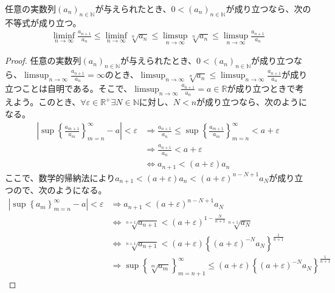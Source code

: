 \documentclass[dvipdfmx]{jsarticle}
\begin{document}
\begin{thm}\label{4.1.6.8}
任意の実数列$\left( a_{n} \right)_{n \in \mathbb{N}}$が与えられたとき、$0 < \left( a_{n} \right)_{n \in \mathbb{N}}$が成り立つなら、次の不等式が成り立つ。
\begin{align*}
\liminf_{n \rightarrow \infty}\frac{a_{n + 1}}{a_{n}} \leq \liminf_{n \rightarrow \infty}\sqrt[n]{a_{n}} \leq \limsup_{n \rightarrow \infty}\sqrt[n]{a_{n}} \leq \limsup_{n \rightarrow \infty}\frac{a_{n + 1}}{a_{n}}
\end{align*}
\end{thm}
\begin{proof}
任意の実数列$\left( a_{n} \right)_{n \in \mathbb{N}}$が与えられたとき、$0 < \left( a_{n} \right)_{n \in \mathbb{N}}$が成り立つなら、$\limsup_{n \rightarrow \infty}\frac{a_{n + 1}}{a_{n}} = \infty$のとき、$\limsup_{n \rightarrow \infty}\sqrt[n]{a_{n}} \leq \limsup_{n \rightarrow \infty}\frac{a_{n + 1}}{a_{n}}$が成り立つことは自明である。そこで、$\limsup_{n \rightarrow \infty}\frac{a_{n + 1}}{a_{n}} = a \in \mathbb{R}$が成り立つときで考えよう。このとき、$\forall\varepsilon \in \mathbb{R}^{+}\exists N \in \mathbb{N}$に対し、$N < n$が成り立つなら、次のようになる。
\begin{align*}
\left| \sup\left\{ \frac{a_{m + 1}}{a_{m}} \right\}_{m = n}^{\infty} - a \right| < \varepsilon &\Rightarrow \frac{a_{n + 1}}{a_{n}} \leq \sup\left\{ \frac{a_{m + 1}}{a_{m}} \right\}_{m = n}^{\infty} < a + \varepsilon\\
&\Rightarrow \frac{a_{n + 1}}{a_{n}} < a + \varepsilon\\
&\Leftrightarrow a_{n + 1} < (a + \varepsilon)a_{n}
\end{align*}
ここで、数学的帰納法により$a_{n + 1} < (a + \varepsilon)a_{n} < (a + \varepsilon)^{n - N + 1}a_{N}$が成り立つので、次のようになる。
\begin{align*}
\left| \sup\left\{ a_{m} \right\}_{m = n}^{\infty} - a \right| < \varepsilon &\Rightarrow a_{n + 1} < (a + \varepsilon)^{n - N + 1}a_{N}\\
&\Leftrightarrow \sqrt[{n + 1}]{a_{n + 1}} < (a + \varepsilon)^{1 - \frac{N}{n + 1}}\sqrt[{n + 1}]{a_{N}}\\
&\Leftrightarrow \sqrt[{n + 1}]{a_{n + 1}} < (a + \varepsilon)\left\{ (a + \varepsilon)^{- N}a_{N} \right\}^{\frac{1}{n + 1}}\\
&\Rightarrow \sup\left\{ \sqrt[m]{a_{m}} \right\}_{m = n + 1}^{\infty} \leq (a + \varepsilon)\left\{ (a + \varepsilon)^{- N}a_{N} \right\}^{\frac{1}{n + 1}}
\end{align*}

\end{proof}
\end{document}
